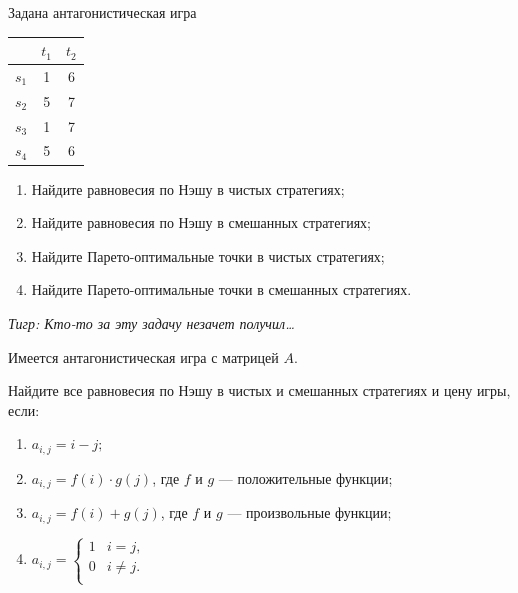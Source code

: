 \begin{problem}

Задана антагонистическая игра\par
\begin{tabular}{|c|c|c|}
\hline
& $t_{1}$ & $t_{2}$ \\
\hline
$s_{1}$ & 1 & 6 \\
$s_{2}$ & 5 & 7 \\
$s_{3}$ & 1 & 7 \\
$s_{4}$ & 5 & 6 \\
\hline
\end{tabular}
\begin{enumerate}
\item	Найдите равновесия по Нэшу в чистых стратегиях;\par
\item 	Найдите равновесия по Нэшу в смешанных стратегиях;\par
\item 	Найдите Парето-оптимальные точки в чистых стратегиях;\par
\item Найдите Парето-оптимальные точки в смешанных стратегиях.\par
\end{enumerate}
{\it Тигр: Кто-то за эту задачу незачет получил\ldots }



\begin{sol}

\end{sol}
\end{problem}



\begin{problem}
 Имеется антагонистическая игра с матрицей $A$.

Найдите все равновесия по Нэшу в чистых и смешанных стратегиях и
цену игры, если:

\begin{enumerate}
\item $a_{i,j}=i-j;$

\item $a_{i,j}=f(i)\cdot g(j)$, где $f$ и $g$ — положительные функции;

\item $a_{i,j}=f(i)+g(j)$, где $f$ и $g$ — произвольные функции;

\item $a_{i,j}=\left\{
\begin{array}{cc}
  1 & i=j, \\
  0 & i\neq j. \\
\end{array}\right.$
\end{enumerate}


\begin{sol}

\end{sol}
\end{problem}


